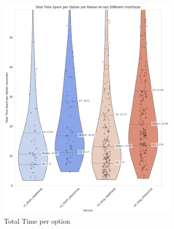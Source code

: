 \begin{figure}[h]
    \centering
    \begin{subfigure}[b]{0.32\textwidth}
        \centering
        \includegraphics[width=\textwidth]{content/image/results/total_time_per_option.pdf}
        \caption{Total Time per option}
        \label{fig:total_time}
    \end{subfigure}
    \hfill
    \begin{subfigure}[b]{0.32\textwidth}
        \centering

\end{subfigure}
\end{figure}
